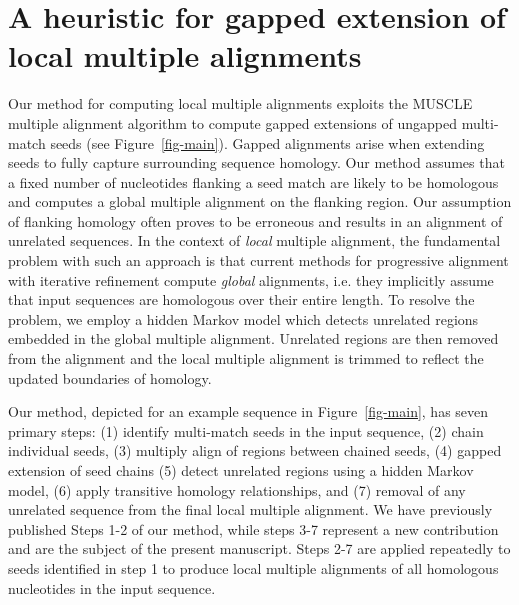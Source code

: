 \documentclass{llncs}
\begin{document}
\section{A heuristic for gapped extension of local multiple alignments}
Our method for computing local multiple alignments exploits the MUSCLE
multiple alignment algorithm to compute gapped extensions of ungapped
multi-match seeds (see Figure~\ref{fig-main}). Gapped alignments arise
when extending seeds to fully capture surrounding sequence
homology. Our method assumes that a fixed number of nucleotides
flanking a seed match are likely to be homologous and computes a
global multiple alignment on the flanking region.  Our assumption of
flanking homology often proves to be erroneous and results in an
alignment of unrelated sequences.  In the context of \textit{local}
multiple alignment, the fundamental problem with such an approach is
that current methods for progressive alignment with iterative
refinement compute \textit{global} alignments, i.e. they implicitly
assume that input sequences are homologous over their entire length.
To resolve the problem, we employ a hidden Markov model which detects
unrelated regions embedded in the global multiple alignment.
Unrelated regions are then removed from the alignment and the
local multiple alignment is trimmed to reflect the updated boundaries
of homology.

Our method, depicted for an example sequence in
Figure~\ref{fig-main}, has seven primary steps: (1) identify
multi-match seeds in the input sequence, (2) chain individual
seeds, (3) multiply align of regions between chained seeds, (4)
gapped extension of seed chains (5) detect unrelated regions
using a hidden Markov model, (6) apply transitive homology
relationships, and (7) removal of any unrelated sequence from
the final local multiple alignment.  We have previously published Steps 1-2 of our method\cite{ref-procrast},
while steps 3-7 represent a new contribution
and are the subject of the present manuscript. Steps 2-7 are applied
repeatedly to seeds identified in step 1 to produce local multiple
alignments of all homologous nucleotides in the input sequence.
\end{document}
